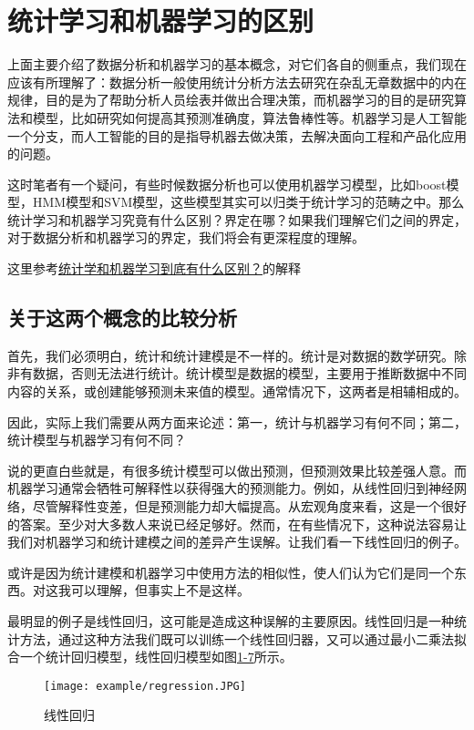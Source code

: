 \section{统计学习和机器学习的区别}

上面主要介绍了数据分析和机器学习的基本概念，对它们各自的侧重点，我们现在应该有所理解了：数据分析一般使用统计分析方法去研究在杂乱无章数据中的内在规律，目的是为了帮助分析人员绘表并做出合理决策，而机器学习的目的是研究算法和模型，比如研究如何提高其预测准确度，算法鲁棒性等。机器学习是人工智能一个分支，而人工智能的目的是指导机器去做决策，去解决面向工程和产品化应用的问题。

这时笔者有一个疑问，有些时候数据分析也可以使用机器学习模型，比如boost模型，HMM模型和SVM模型，这些模型其实可以归类于统计学习的范畴之中。那么统计学习和机器学习究竟有什么区别？界定在哪？如果我们理解它们之间的界定，对于数据分析和机器学习的界定，我们将会有更深程度的理解。

这里参考\href{https://blog.csdn.net/qq_41892229/article/details/90140493}{统计学和机器学习到底有什么区别？}的解释


\subsection{关于这两个概念的比较分析}
首先，我们必须明白，统计和统计建模是不一样的。统计是对数据的数学研究。除非有数据，否则无法进行统计。统计模型是数据的模型，主要用于推断数据中不同内容的关系，或创建能够预测未来值的模型。通常情况下，这两者是相辅相成的。

因此，实际上我们需要从两方面来论述：第一，统计与机器学习有何不同；第二，统计模型与机器学习有何不同？

说的更直白些就是，有很多统计模型可以做出预测，但预测效果比较差强人意。而机器学习通常会牺牲可解释性以获得强大的预测能力。例如，从线性回归到神经网络，尽管解释性变差，但是预测能力却大幅提高。从宏观角度来看，这是一个很好的答案。至少对大多数人来说已经足够好。然而，在有些情况下，这种说法容易让我们对机器学习和统计建模之间的差异产生误解。让我们看一下线性回归的例子。


或许是因为统计建模和机器学习中使用方法的相似性，使人们认为它们是同一个东西。对这我可以理解，但事实上不是这样。

最明显的例子是线性回归，这可能是造成这种误解的主要原因。线性回归是一种统计方法，通过这种方法我们既可以训练一个线性回归器，又可以通过最小二乘法拟合一个统计回归模型，线性回归模型如图\href{figure:1-7}{1-7}所示。

\begin{figure}[!htp]

\centering
\texttt{[image: example/regression.JPG]}
\caption{线性回归}
\label{figure:1-7}

\end{figure}

